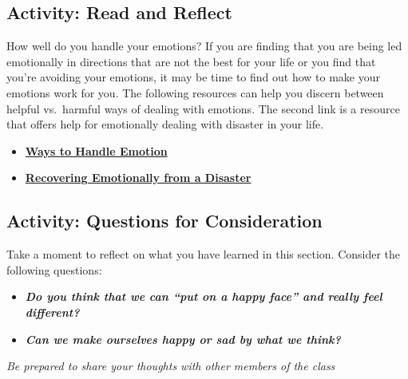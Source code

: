 \documentclass[
]{book}
\providecommand{\tightlist}{%
  \setlength{\itemsep}{0pt}\setlength{\parskip}{0pt}}
\begin{document}
\hypertarget{activity-read-and-reflect-14}{%
\subsection*{Activity: Read and Reflect}\label{activity-read-and-reflect-14}}

\begin{reflect}
How well do you handle your emotions? If you are finding that you are being led emotionally in directions that are not the best for your life or you find that you're avoiding your emotions, it may be time to find out how to make your emotions work for you. The following resources can help you discern between helpful vs.~harmful ways of dealing with emotions. The second link is a resource that offers help for emotionally dealing with disaster in your life.

\begin{itemize}
\tightlist
\item
  \href{https://www.mhanational.org/helpful-vs-harmful-ways-manage-emotions}{\textbf{Ways to Handle Emotion}}\\
\item
  \href{https://www.apa.org/helpcenter/recovering-disasters}{\textbf{Recovering Emotionally from a Disaster}}
\end{itemize}
\end{reflect}

\hypertarget{activity-questions-for-consideration-14}{%
\subsection*{Activity: Questions for Consideration}\label{activity-questions-for-consideration-14}}

\begin{reflect}
Take a moment to reflect on what you have learned in this section. Consider the following questions:

\begin{itemize}
\tightlist
\item
  \textbf{\emph{Do you think that we can ``put on a happy face'' and really feel different?}}\\
\item
  \textbf{\emph{Can we make ourselves happy or sad by what we think?}}
\end{itemize}

\emph{Be prepared to share your thoughts with other members of the class}
\end{reflect}
\end{document}
